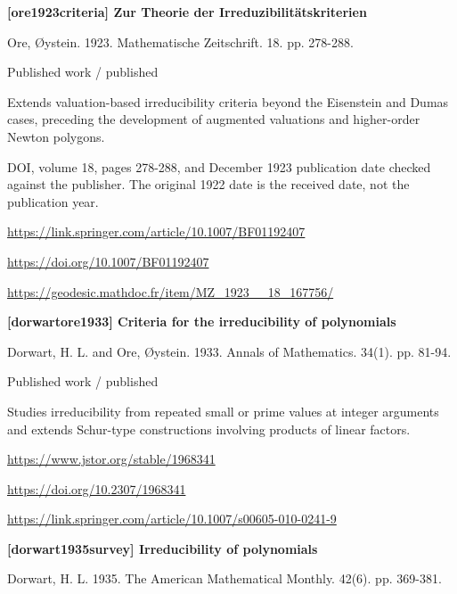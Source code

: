 \documentclass[11pt,a4paper,oneside,openany]{book}
\begin{document}
\hypertarget{ref:ore1923criteria}{}
{\sffamily\bfseries\color{atlasgreen}[ore1923criteria] Zur Theorie der Irreduzibilitätskriterien}\par
\color{black} Ore, Øystein. 1923. Mathematische Zeitschrift. 18. pp. 278-288.\par
{\small\sffamily\color{atlasgold}Published work / published}\par
\color{black} Extends valuation-based irreducibility criteria beyond the Eisenstein and Dumas cases, preceding the development of augmented valuations and higher-order Newton polygons.\par
{\small DOI, volume 18, pages 278-288, and December 1923 publication date checked against the publisher. The original 1922 date is the received date, not the publication year.}\par
{\footnotesize\url{https://link.springer.com/article/10.1007/BF01192407}}\par
{\footnotesize\url{https://doi.org/10.1007/BF01192407}}\par
{\footnotesize\url{https://geodesic.mathdoc.fr/item/MZ_1923__18_167756/}}\par
\vspace{9pt}
\hypertarget{ref:dorwartore1933}{}
{\sffamily\bfseries\color{atlasgreen}[dorwartore1933] Criteria for the irreducibility of polynomials}\par
\color{black} Dorwart, H. L. and Ore, Øystein. 1933. Annals of Mathematics. 34(1). pp. 81-94.\par
{\small\sffamily\color{atlasgold}Published work / published}\par
\color{black} Studies irreducibility from repeated small or prime values at integer arguments and extends Schur-type constructions involving products of linear factors.\par
{\footnotesize\url{https://www.jstor.org/stable/1968341}}\par
{\footnotesize\url{https://doi.org/10.2307/1968341}}\par
{\footnotesize\url{https://link.springer.com/article/10.1007/s00605-010-0241-9}}\par
\vspace{9pt}
\hypertarget{ref:dorwart1935survey}{}
{\sffamily\bfseries\color{atlasgreen}[dorwart1935survey] Irreducibility of polynomials}\par
\color{black} Dorwart, H. L. 1935. The American Mathematical Monthly. 42(6). pp. 369-381.\par
\end{document}

